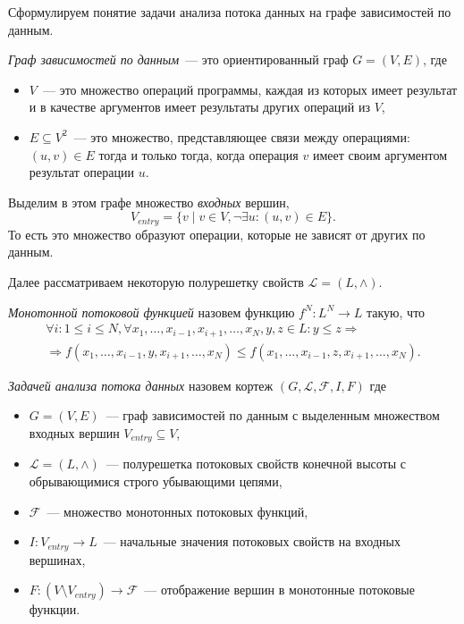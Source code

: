 \documentclass[14pt,titlepage,draft]{extarticle}
\newcommand{\Lattice}{\mathcal{L}}
\newcommand{\meet}{\wedge}
\begin{document}
    Сформулируем понятие задачи анализа потока данных на графе зависимостей по
    данным.

    \emph{Граф зависимостей по данным}~--- это ориентированный граф
    $G = (V, E)$, где
    \begin{itemize}
      \item $V$~--- это множество операций программы, каждая из которых имеет
            результат и в качестве аргументов имеет результаты других операций
            из $V$,
      \item $E \subseteq V^2$~--- это множество, представляющее связи между
            операциями: $(u, v) \in E$ тогда и только тогда, когда операция $v$
            имеет своим аргументом результат операции $u$.
    \end{itemize}

    Выделим в этом графе множество \emph{входных} вершин,
    \[ V_{entry} = \{ v \mid v \in V, \lnot \exists u\colon (u, v) \in E \}. \]
    То есть это множество образуют операции, которые не зависят от других по
    данным.

    Далее рассматриваем некоторую полурешетку свойств $\Lattice = (L, \meet)$.

    \emph{Монотонной потоковой функцией} назовем функцию $f^N \colon L^N \to L$
    такую, что
    \begin{multline*}
      \forall i\colon 1 \leq i \leq N,
      \forall x_1, \ldots, x_{i-1}, x_{i+1}, \ldots, x_N, y, z \in L \colon
        y \leq z \Rightarrow \\
        \Rightarrow
        f(x_1, \ldots, x_{i-1}, y, x_{i+1}, \ldots, x_N) \leq
        f(x_1, \ldots, x_{i-1}, z, x_{i+1}, \ldots, x_N).
    \end{multline*}

    \emph{Задачей анализа потока данных} назовем кортеж $(G, \Lattice,
    \mathcal{F}, I, F)$ где
    \begin{itemize}
      \item $G = (V, E)$~--- граф зависимостей по данным с выделенным
            множеством входных вершин $V_{entry} \subseteq V$,
      \item $\Lattice = (L, \meet)$~--- полурешетка потоковых свойств конечной
            высоты с обрывающимися строго убывающими цепями,
      \item $\mathcal{F}$~--- множество монотонных потоковых функций,
      \item $I\colon V_{entry} \to L$~--- начальные значения потоковых свойств
            на входных вершинах,
      \item $F\colon (V \setminus V_{entry}) \to \mathcal{F}$~--- отображение
            вершин в монотонные потоковые функции.
    \end{itemize}
\end{document}
